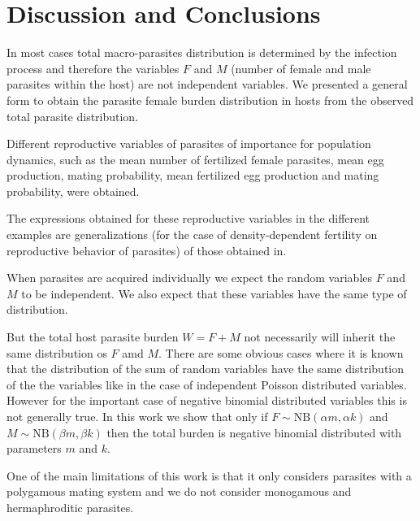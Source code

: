 \documentclass[12pt,a4paper]{article}
\theoremstyle{plain}%
\theoremstyle{definition}
\theoremstyle{remark}
\begin{document}
	
\section{Discussion and Conclusions}
	
		
In most cases total macro-parasites distribution is determined by the infection process and therefore the variables $F$ and $M$ (number of female and male parasites within the host) are not independent variables. We presented a general form to obtain the parasite female burden distribution in hosts from the observed total parasite distribution. 	
	
Different reproductive variables of parasites of importance for population dynamics, such as the mean number of fertilized female parasites, mean egg production, mating probability, mean fertilized egg production and mating probability, were obtained. 
	
The  expressions obtained for these reproductive variables in the different examples are generalizations (for the case of density-dependent fertility on reproductive behavior of parasites) of those obtained in\citep{leyton1968stochastic,may1993biased,may1977togetherness}.



When parasites are acquired individually we expect the random variables $F$ and $M$ to be independent. We also expect that these variables have the same type of distribution. 


But the total host parasite burden $W=F+M$ not necessarily will inherit the same distribution os $F$ amd $M$. There are some obvious cases where it is known that the distribution of the sum of random variables have the same distribution of the the variables like in the case of independent Poisson distributed variables. However for the important case of negative binomial distributed variables this is not generally true. In this work we show that 
only if
$F\sim \mathrm{NB}(\alpha m,\alpha k)$ and $ M\sim \mathrm{NB}(\beta m,\beta k)$ then the total burden is negative binomial distributed with parameters $m$ and $k$. 


	
One of the main limitations of this work is that it only considers parasites with a polygamous mating system and we do not consider monogamous and hermaphroditic parasites.
\end{document}
